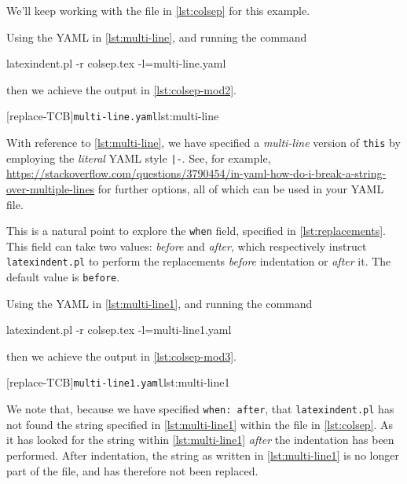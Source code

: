 \documentclass[10pt]{article}
\begin{document}
 \begin{example}
 We'll keep working with the file in \vref{lst:colsep} for this example.

 Using the YAML in \cref{lst:multi-line}, and running the command  

 \begin{commandshell}
latexindent.pl -r colsep.tex -l=multi-line.yaml
\end{commandshell}

 then we achieve the output in \cref{lst:colsep-mod2}.
 \begin{cmhtcbraster}[raster column skip=.01\linewidth]
  [replace-TCB]{\texttt{multi-line.yaml}}{lst:multi-line}
 \end{cmhtcbraster}
 With reference to \cref{lst:multi-line}, we have specified a \emph{multi-line} version
 of \texttt{this} by employing the \emph{literal} YAML style \lstinline!|-!. See, for
 example,
 \href{https://stackoverflow.com/questions/3790454/in-yaml-how-do-i-break-a-string-over-multiple-lines}{https://stackoverflow.com/questions/3790454/in-yaml-how-do-i-break-a-string-over-multiple-lines}
 for further options, all of which can be used in your YAML file.

 This is a natural point to explore the \texttt{when} field, specified in
 \vref{lst:replacements}. This field can take two values: \emph{before} and \emph{after},
 which respectively instruct \texttt{latexindent.pl} to perform the replacements
 \emph{before} indentation or \emph{after} it. The default value is \texttt{before}.

 Using the YAML in \cref{lst:multi-line1}, and running the command  

 \begin{commandshell}
latexindent.pl -r colsep.tex -l=multi-line1.yaml
\end{commandshell}

 then we achieve the output in \cref{lst:colsep-mod3}.
 \begin{cmhtcbraster}[raster column skip=.01\linewidth]
  [replace-TCB]{\texttt{multi-line1.yaml}}{lst:multi-line1}
 \end{cmhtcbraster}
 We note that, because we have specified \texttt{when: after}, that
 \texttt{latexindent.pl} has not found the string specified in \cref{lst:multi-line1}
 within the file in \vref{lst:colsep}. As it has looked for the string within
 \cref{lst:multi-line1} \emph{after} the indentation has been performed. After
 indentation, the string as written in \cref{lst:multi-line1} is no longer part of the
 file, and has therefore not been replaced.


\end{example}
\end{document}
